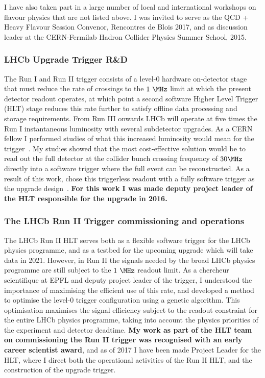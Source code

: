 I have also taken part in a large number of local and international workshops on flavour physics that are not listed above. 
I was invited to serve as the QCD + Heavy Flavour Session Convenor, Rencontres de Blois 2017, and as discussion leader at the CERN-Fermilab Hadron Collider Physics Summer School, 2015.

\subsubsection*{LHCb Upgrade Trigger R\&D}
The \LHCb Run I and Run II trigger consists of a level-0 hardware on-detector stage that must reduce the rate of \pp crossings to the $1~\MHz$ limit at which the present detector readout operates, at which point a second software Higher Level Trigger (HLT) stage reduces this rate further to satisfy offline data processing and storage requirements. From Run III onwards LHCb will operate at five times the Run I instantaneous luminosity with several subdetector upgrades. As a CERN fellow I performed studies of what this increased luminosity would mean for the trigger~\cite{LHCb-PUB-2014-027}. My studies showed that the most cost-effective solution would be to read out the full detector at the collider bunch crossing frequency of $30\MHz$ directly into a software trigger where the full event can be reconstructed. As a result of this work, \LHCb chose this triggerless readout with a fully software trigger as the upgrade design~\cite{CERN-LHCC-2014-016}. \textbf{For this work I was made deputy project leader of the HLT responsible for the upgrade in 2016.}

\subsubsection*{The LHCb Run II Trigger commissioning and operations}
The LHCb Run II HLT serves both as a flexible software trigger for the LHCb physics programme, and as a testbed for the upcoming upgrade which will take data in 2021.
However, in Run II the signals needed by the broad LHCb physics programme are still subject to the $1~\MHz$ readout limit.
As a chercheur scientifique at EPFL and deputy project leader of the trigger, I understood the importance of maximising the efficient use of this rate, and developed a method to optimise the level-0 trigger configuration using a genetic algorithm. This optimisation maximises the signal efficiency subject to the readout constraint for the entire LHCb physics programme, taking into account the physics priorities of the experiment and detector deadtime. \textbf{My work as part of the HLT team on commissioning the Run II trigger was recognised with an \LHCb early career scientist award}, and as of 2017 I have been made Project Leader for the HLT, where I direct both the operational activities of the Run II HLT, and the construction of the upgrade trigger.